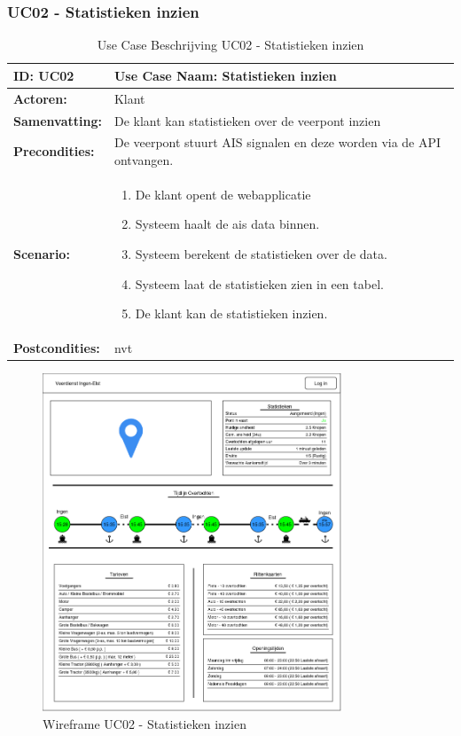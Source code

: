 \documentclass{article}
\begin{document}
\subsubsection{UC02 - Statistieken inzien}
\begin{table}[H]
    \centering
    \begin{tabularx}{\textwidth}{|l|X|}
        \hline
        \textbf{ID:} UC02 & \textbf{Use Case Naam:} Statistieken inzien  \\
        \hline
        \textbf{Actoren:} & Klant \\
        \hline
        \textbf{Samenvatting:}  & De klant kan statistieken over de veerpont inzien \\
        \hline 
        \textbf{Precondities:} & De veerpont stuurt AIS signalen en deze worden via de API ontvangen. \\
        \hline
        \textbf{Scenario:} & \begin{enumerate}
            \item De klant opent de webapplicatie
            \item Systeem haalt de ais data binnen.
            \item Systeem berekent de statistieken over de data.
            \item Systeem laat de statistieken zien in een tabel.
            \item De klant kan de statistieken inzien.
        \end{enumerate} \\
        \hline 
        \textbf{Postcondities:} & nvt \\ 
        \hline

    \end{tabularx}
    \caption{Use Case Beschrijving UC02 - Statistieken inzien}
\end{table}
\begin{figure}[H]
    \centering
    \includegraphics[width=0.8\textwidth]{images/wireframe_startpagina.png}
    \caption{Wireframe UC02 - Statistieken inzien}
    \label{fig:wf2}
\end{figure}
\end{document}
